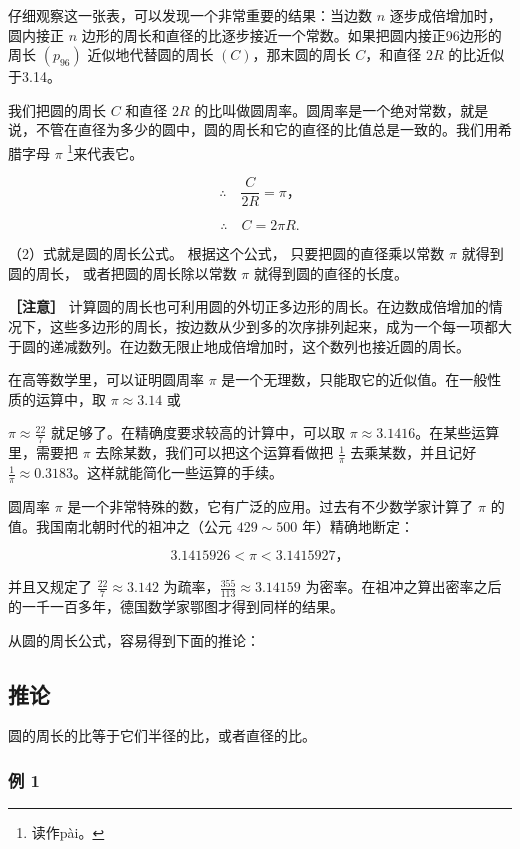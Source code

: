 仔细观察这一张表，可以发现一个非常重要的结果：当边数 \(n\)
逐步成倍增加时，圆内接正 \(n\)
边形的周长和直径的比逐步接近一个常数。如果把圆内接正96边形的周长
\((p_{96})\) 近似地代替圆的周长 \((C)\)，那末圆的周长 \(C\)，和直径
\(2R\) 的比近似于3.14。

我们把圆的周长 \(C\) 和直径 \(2R\)
的比叫做圆周率。圆周率是一个绝对常数，就是说，不管在直径为多少的圆中，圆的周长和它的直径的比值总是一致的。我们用希腊字母
\(\pi\) \footnote{读作pài。}来代表它。

\[
\therefore \quad \frac {C}{2 R} = \pi \text{，}
\]

\[
\therefore \quad C = 2 \pi R. \tag {2}
\]

（2）式就是圆的周长公式。 根据这个公式， 只要把圆的直径乘以常数 \(\pi\)
就得到圆的周长， 或者把圆的周长除以常数 \(\pi\) 就得到圆的直径的长度。

\textbf{［注意］}
计算圆的周长也可利用圆的外切正多边形的周长。在边数成倍增加的情况下，这些多边形的周长，按边数从少到多的次序排列起来，成为一个每一项都大于圆的递减数列。在边数无限止地成倍增加时，这个数列也接近圆的周长。

在高等数学里，可以证明圆周率 \(\pi\)
是一个无理数，只能取它的近似值。在一般性质的运算中，取
\(\pi \approx 3.14\) 或

\(\pi \approx \frac{22}{7}\) 就足够了。在精确度要求较高的计算中，可以取
\(\pi \approx 3.1416\)。在某些运算里，需要把 \(\pi\)
去除某数，我们可以把这个运算看做把 \(\frac{1}{\pi}\) 去乘某数，并且记好
\(\frac{1}{\pi} \approx 0.3183\)。这样就能简化一些运算的手续。

圆周率 \(\pi\)
是一个非常特殊的数，它有广泛的应用。过去有不少数学家计算了 \(\pi\)
的值。我国南北朝时代的祖冲之（公元 \(429\sim 500\) 年）精确地断定：

\[
3.1415926 < \pi < 3.1415927\text{，}
\]

并且又规定了 \(\frac{22}{7} \approx 3.142\)
为疏率，\(\frac{355}{113} \approx 3.14159\)
为密率。在祖冲之算出密率之后的一千一百多年，德国数学家鄂图才得到同样的结果。

从圆的周长公式，容易得到下面的推论：

\subsection{推论}

圆的周长的比等于它们半径的比，或者直径的比。

\subsubsection{例 1}

